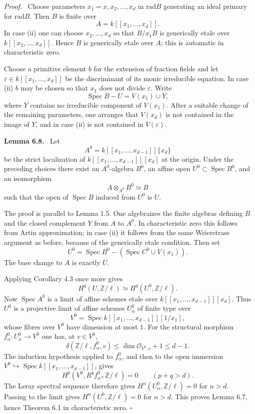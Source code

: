 \documentclass[12pt]{article}
\newcommand{\Oo}{\mathcal O}
\newcommand{\ZZ}{\mathbb Z}
\DeclareMathOperator{\Spec}{Spec}
\newcommand{\rad}{\mathrm{rad}}
\newcommand{\qedtext}{\hfill\(\square\)}
\newenvironment{statement}[1]{\par\medskip\noindent\textbf{#1.}\ }{\par\medskip}
\newenvironment{prooftext}[1][Proof]{\par\noindent\emph{#1.}\ }{\par\medskip}
\begin{document}
\begin{prooftext}
Choose parameters $x_1=x,x_2,\ldots,x_d$ in $\rad B$ generating an ideal primary for $\rad B$. Then $B$ is finite over
\[
   A=k[[x_1,\ldots,x_d]].
\]
In case (ii) one can choose $x_2,\ldots,x_d$ so that $B/x_1B$ is generically etale over $k[[x_2,\ldots,x_d]]$. Hence $B$ is generically etale over $A$; this is automatic in characteristic zero.

Choose a primitive element $b$ for the extension of fraction fields and let $\varepsilon\in k[[x_1,
\ldots,x_d]]$ be the discriminant of its monic irreducible equation. In case (ii) $b$ may be chosen so that $x_1$ does not divide $\varepsilon$. Write
\[
   \Spec B-U=V(x_1)\cup Y,
\]
where $Y$ contains no irreducible component of $V(x_1)$. After a suitable change of the remaining parameters, one arranges that $V(x_d)$ is not contained in the image of $Y$, and in case (ii) is not contained in $V(\varepsilon)$.

\begin{statement}{Lemma 6.8}
Let
\[
   A^0=k[[x_1,\ldots,x_{d-1}]]\{x_d\}
\]
be the strict localization of $k[[x_1,\ldots,x_{d-1}]][x_d]$ at the origin. Under the preceding choices there exist an $A^0$-algebra $B^0$, an affine open $U^0\subset\Spec B^0$, and an isomorphism
\[
   A\otimes_{A^0}B^0\simeq B
\]
such that the open of $\Spec B$ induced from $U^0$ is $U$.
\end{statement}

The proof is parallel to Lemma 1.5. One algebraizes the finite algebras defining $B$ and the closed complement $Y$ from $A$ to $A^0$. In characteristic zero this follows from Artin approximation; in case (ii) it follows from the same Weierstrass argument as before, because of the generically etale condition. Then set
\[
   U^0=\Spec B^0-(\Spec C^0\cup V(x_1)).
\]
The base change to $A$ is exactly $U$.

Applying Corollary 4.3 once more gives
\[
   H^q(U,\ZZ/\ell)\simeq H^q(U^0,\ZZ/\ell).
\]
Now $\Spec A^0$ is a limit of affine schemes etale over $k[[x_1,\ldots,x_{d-1}]][x_d]$. Thus $U^0$ is a projective limit of affine schemes $U^0_\alpha$ of finite type over
\[
   V^0=\Spec k[[x_1,\ldots,x_{d-1}]][1/x_1],
\]
whose fibres over $V^0$ have dimension at most $1$. For the structural morphism $f^0_\alpha:U^0_\alpha\to V^0$ one has, at $v\in V^0$,
\[
   \delta(\ZZ/\ell,f^0_\alpha,v)\le \dim\Oo_{V^0,v}+1\le d-1.
\]
The induction hypothesis applied to $f^0_\alpha$, and then to the open immersion $V^0\hookrightarrow\Spec k[[x_1,\ldots,x_{d-1}]]$, gives
\[
   H^p(V^0,R^qf^0_{\alpha*}\ZZ/\ell)=0\qquad(p+q>d).
\]
The Leray spectral sequence therefore gives $H^n(U^0_\alpha,\ZZ/\ell)=0$ for $n>d$. Passing to the limit gives $H^n(U^0,\ZZ/\ell)=0$ for $n>d$. This proves Lemma 6.7, hence Theorem 6.1 in characteristic zero. \qedtext
\end{prooftext}
\end{document}
